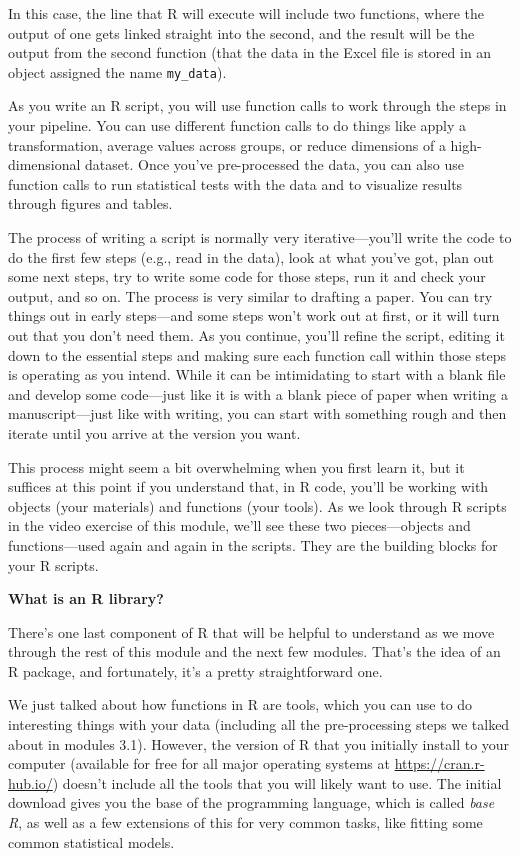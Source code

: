 \documentclass[]{tufte-book}
\begin{document}
In this case, the line that R will execute will include two functions, where the
output of one gets linked straight into the second, and the result will be the
output from the second function (that the data in the Excel file is stored in
an object assigned the name \texttt{my\_data}).

As you write an R script, you will use function calls to work through the
steps in your pipeline. You can use different function calls to do things like
apply a transformation, average values across groups, or reduce dimensions of
a high-dimensional dataset. Once you've pre-processed the data, you can also use
function calls to run statistical tests with the data and to visualize results
through figures and tables.

The process of writing a script is normally very iterative---you'll write the
code to do the first few steps (e.g., read in the data), look at what you've
got, plan out some next steps, try to write some code for those steps, run it
and check your output, and so on. The process is very similar to drafting a
paper. You can try things out in early steps---and some steps won't work out at
first, or it will turn out that you don't need them. As you continue, you'll
refine the script, editing it down to the essential steps and making sure each
function call within those steps is operating as you intend. While it can be
intimidating to start with a blank file and develop some code---just like it is
with a blank piece of paper when writing a manuscript---just like with writing,
you can start with something rough and then iterate until you arrive at
the version you want.

This process might seem a bit overwhelming when you first learn it, but it
suffices at this point if you understand that, in R code, you'll be working with
objects (your materials) and functions (your tools). As we look through R
scripts in the video exercise of this module, we'll see these two pieces---objects and
functions---used again and again in the scripts. They are the building blocks
for your R scripts.

\textbf{What is an R library?}

There's one last component of R that will be helpful to understand as we move through
the rest of this module and the next few modules. That's the idea of an R package, and
fortunately, it's a pretty straightforward one.

We just talked about how functions in R are tools, which you can use to do interesting
things with your data (including all the pre-processing steps we talked about in
modules 3.1). However, the version of R that you initially install to your computer
(available for free for all major operating systems at \url{https://cran.r-hub.io/}) doesn't
include all the tools that you will likely want to use. The initial download gives you
the base of the programming language, which is called \emph{base R}, as well as a few
extensions of this for very common tasks, like fitting some common statistical models.
\end{document}
